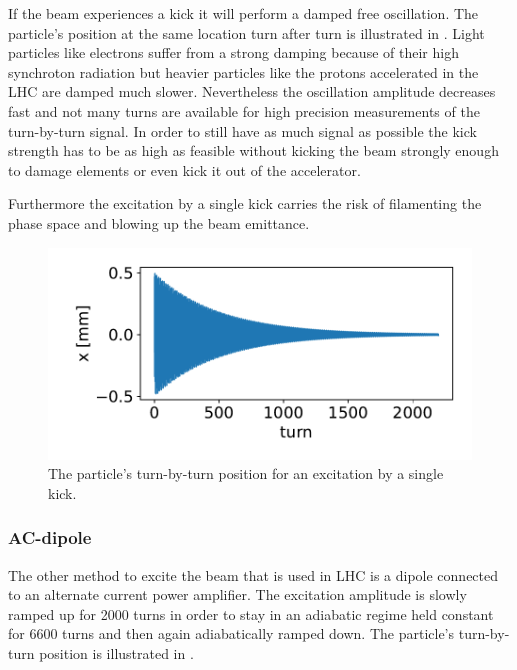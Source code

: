If the beam experiences a kick it will perform a damped free oscillation.
The particle's position at the same location turn after turn is illustrated in .
Light particles like electrons
suffer from a strong damping because of their high synchroton radiation but heavier particles like the
protons accelerated in the LHC are damped much slower.
Nevertheless the oscillation amplitude decreases fast and not many turns are available for high
precision measurements of the turn-by-turn signal. In order to still have as much signal as possible
the kick strength has to be as high as feasible without kicking the beam strongly enough to damage elements or even kick it out of the accelerator.

Furthermore the excitation by a single kick carries the risk of filamenting the
phase space and blowing up the beam emittance.
%
\begin{figure}[h]
    \centering
    \includegraphics[width=.8\linewidth]{kick_plot.pdf}  
    \caption{The particle's turn-by-turn position for an excitation by a single kick.}
    \label{fig_kick_plot}
\end{figure}
%
\subsubsection{AC-dipole}

The other method to excite the beam that is used in LHC is a dipole connected to an alternate current
power amplifier. The excitation amplitude is slowly ramped up for 2000 turns in order to stay in an
adiabatic regime held constant for 6600 turns and then again adiabatically ramped down.
The particle's turn-by-turn position is illustrated in .

